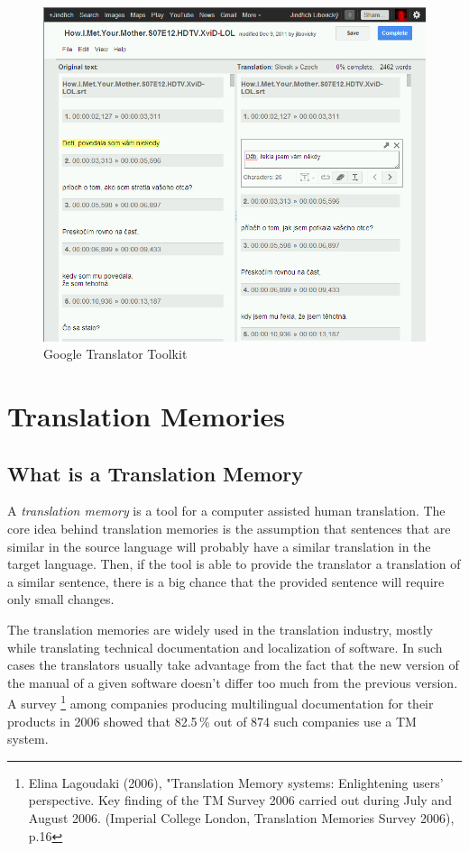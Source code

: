 \begin{figure}

\begin{center}
\includegraphics[scale=0.4]{./figures/google_translator_toolkit.png}
\end{center}

\caption{Google Translator Toolkit} \label{google_translator_toolkit}
\end{figure}

\section{Translation Memories}
\label{sec:translation_memories}
\subsection{What is a Translation Memory}

A \emph{translation memory} is a tool for a computer assisted human translation. The core idea behind translation memories is the assumption that sentences that are similar in the source language will probably have a similar translation in the target language. Then, if the tool is able to provide the translator a translation of a similar sentence, there is a big chance that the provided sentence will require only small changes.

The translation memories are widely used in the translation industry, mostly while translating technical documentation and localization of software. In such cases the translators usually take advantage from the fact that the new version of the manual of a given software doesn't differ too much from the previous version. A survey \footnote{Elina Lagoudaki (2006), "Translation Memory systems: Enlightening users' perspective. Key finding of the TM Survey 2006 carried out during July and August 2006. (Imperial College London, Translation Memories Survey 2006), p.16} among companies producing multilingual documentation for their products in 2006 showed that 82.5\,\% out of 874 such companies use a TM system.

